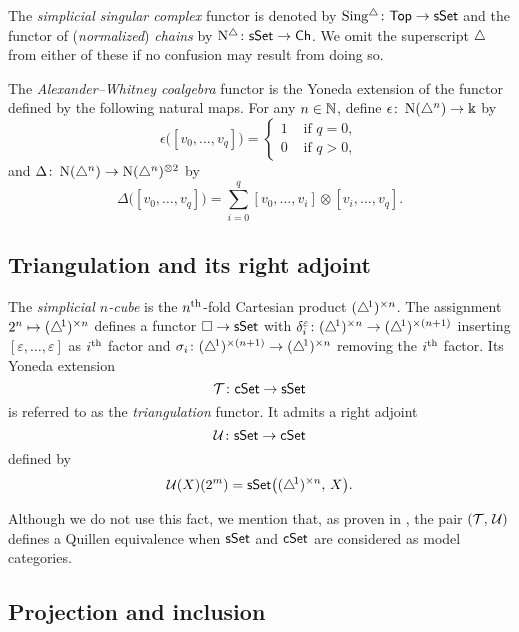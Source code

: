 The \textit{simplicial singular complex} functor is denoted by $\operatorname{Sing^{\triangle}} \colon \mathsf{Top} \to \mathsf{sSet}$ and the functor of (\textit{normalized}) \textit{chains} by $\operatorname{N^{\triangle}} \colon \mathsf{sSet} \to \mathsf{Ch}$.
We omit the superscript $\triangle$ from either of these if no confusion may result from doing so.

The \textit{Alexander--Whitney coalgebra} functor is the Yoneda extension of the functor defined by the following natural maps.
For any $n \in \mathbb{N}$, define $\epsilon \colon \operatorname{N}(\triangle^n) \to \Bbbk$ by
\[
\epsilon \big( [v_0, \dots, v_q] \big) = \begin{cases} 1 & \text{ if } q = 0, \\ 0 & \text{ if } q>0, \end{cases}
\]
and $\Delta \colon \operatorname{N}(\triangle^n) \to \operatorname{N}(\triangle^n)^{\otimes2}$ by
\[
\Delta \big( [v_0, \dots, v_q] \big) = \sum_{i=0}^q [v_0, \dots, v_i] \otimes [v_i, \dots, v_q].
\]




\subsection{Triangulation and its right adjoint}

The \textit{simplicial $n$-cube} is the $n^{\mathrm{th}}$-fold Cartesian product $(\triangle^{\!1})^{\times n}$.
The assignment $2^n \mapsto (\triangle^{\!1})^{\times n}$ defines a functor $\square \to \mathsf{sSet}$ with $\delta_i^\varepsilon \colon (\triangle^{\!1})^{\times n} \to (\triangle^{\!1})^{\times (n+1)}$ inserting $[\varepsilon, \dots, \varepsilon]$ as $i^{\mathrm{th}}$ factor and $\sigma_i \colon (\triangle^{\!1})^{\times (n+1)} \to (\triangle^{\!1})^{\times n}$ removing the $i^{\mathrm{th}}$ factor.
Its Yoneda extension
\[
\operatorname{\mathcal{T}} \colon \mathsf{cSet} \to \mathsf{sSet}
\]
is referred to as the \textit{triangulation} functor.
It admits a right adjoint
\[
\operatorname{\mathcal{U}} \colon \mathsf{sSet} \to \mathsf{cSet}
\]
defined by
\[
\operatorname{\mathcal{U}}(X)(2^m) = \mathsf{sSet} \big( (\triangle^{\!1})^{\times n}, \, X \big).
\]

Although we do not use this fact, we mention that, as proven in \cite[.30]{cisinski2006presheaves}, the pair $(\operatorname{\mathcal{T}},\, \operatorname{\mathcal{U}})$ defines a Quillen equivalence when $\mathsf{sSet}$ and $\mathsf{cSet}$ are considered as model categories.

\subsection{Projection and inclusion} \label{ss:projection and inclusion}

